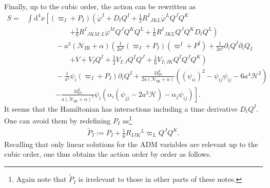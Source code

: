 \documentclass[aps, prd
, preprint
, nofootinbib 
, longbibliography
]{revtex4-1}
\newcommand{\dd}{\mathrm{d}}
\newcommand{\Mpl}{M_\mathrm{Pl}}
\newcommand{\IR}{\mathrm{IR}}
\newcommand{\calH}{\mathcal{H}}
\newcommand{\calN}{\mathcal{N}}
\newcommand{\bae}[1]{\begin{align} #1 \end{align}}
\begin{document}
Finally, up to the cubic order, the action can be rewritten as
\bae{
    S=&\int\dd^4x\left[(\varpi_I+P_I)\left(\dot{\varphi}^I+D_tQ^I+\frac{1}{2}R^I{}_{JKL}\dot{\varphi}^LQ^JQ^K \right.\right. \nonumber \\
    &\qquad\qquad\qquad\left.+\frac{1}{6}R^I{}_{JKM;L}\dot{\varphi}^MQ^JQ^KQ^L+\frac{1}{6}R^I{}_{JKL}Q^JQ^KD_tQ^L\right) \nonumber \\
    &\qquad\qquad-a^3(\calN_\IR+\alpha)\left(\frac{1}{2a^6}(\varpi_I+P_I)(\varpi^I+P^I)+\frac{1}{2a^2}\partial_iQ^I\partial_iQ_I \right. \nonumber \\
    &\qquad\qquad\qquad\left.+V+V_IQ^I+\frac{1}{2}V_{I;J}Q^IQ^J+\frac{1}{6}V_{I;JK}Q^IQ^JQ^K\right) \nonumber \\
    &\qquad\qquad-\frac{1}{a^2}\psi_i(\varpi_I+P_I)\partial_iQ^I+\frac{\Mpl^2}{2a(\calN_\IR+\alpha)}\left((\psi_{ii})^2-\psi_{ij}\psi_{ij}-6a^4\calH^2\right) \nonumber \\
    &\qquad\qquad\left.-\frac{\Mpl^2}{a(\calN_\IR+\alpha)^2}\psi_i\left(\alpha_i(\psi_{jj}-2a^2\calH)-\alpha_j\psi_{ij}\right)\right].
}
It seems that the Hamiltonian has interactions including a time derivative $D_tQ^I$. One can avoid them by redefining $P_I$ as\footnote{Again note that $\tilde{P}_I$ is irrelevant to those in other parts of these notes.}
\bae{\label{eq: trs tildeP}
	\tilde{P}_I:=P_I+\frac{1}{6}R_{IJK}{}^L\varpi_LQ^JQ^K.
}
Recalling that only linear solutions for the ADM variables are relevant up to the cubic order, one thus obtains the action order by order as follows.
\end{document}

